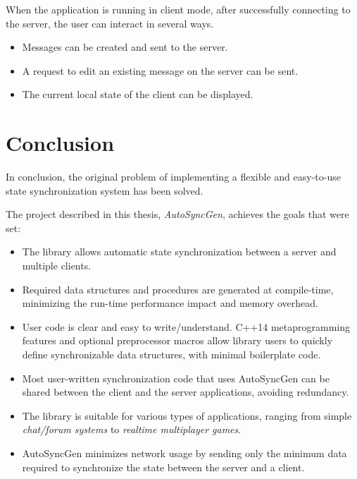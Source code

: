 \documentclass{report}
\begin{document}
                When the application is running in client mode, after successfully connecting to the server, the user can interact in several ways.

                \begin{itemize}
                  \item Messages can be created and sent to the server.
                  \item A request to edit an existing message on the server can be sent.
                  \item The current local state of the client can be displayed.
                \end{itemize}



    \newpage

        \chapter{Conclusion}

            In conclusion, the original problem of implementing a flexible and easy-to-use state synchronization system has been solved.

            The project described in this thesis, \emph{AutoSyncGen}, achieves the goals that were set:

            \begin{itemize}
                \item The library allows automatic state synchronization between a server and multiple clients.
                \item Required data structures and procedures are generated at compile-time, minimizing the run-time performance impact and memory overhead.
                \item User code is clear and easy to write/understand. C++14 metaprogramming features and optional preprocessor macros allow library users to quickly define synchronizable data structures, with minimal boilerplate code.
                \item Most user-written synchronization code that uses AutoSyncGen can be shared between the client and the server applications, avoiding redundancy.
                \item The library is suitable for various types of applications, ranging from simple \emph{chat/forum systems} to \emph{realtime multiplayer games}.
                \item AutoSyncGen minimizes network usage by sending only the minimum data required to synchronize the state between the server and a client.
            \end{itemize}
\end{document}
